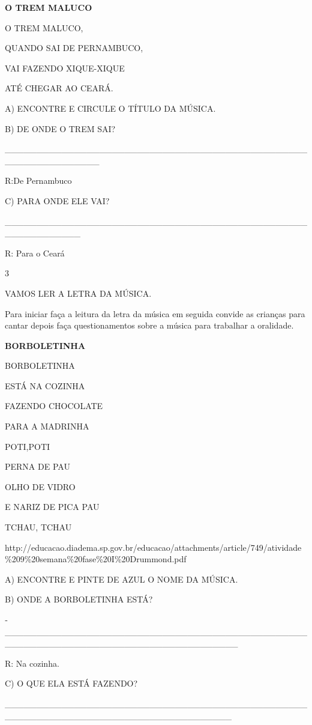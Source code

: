 {{\textbf{O TREM MALUCO}

O TREM MALUCO,

QUANDO SAI DE PERNAMBUCO,

VAI FAZENDO XIQUE-XIQUE

ATÉ CHEGAR AO CEARÁ.

A) ENCONTRE E CIRCULE O TÍTULO DA MÚSICA.

B) DE ONDE O TREM SAI?

\_\_\_\_\_\_\_\_\_\_\_\_\_\_\_\_\_\_\_\_\_\_\_\_\_\_\_\_\_\_\_\_\_\_\_\_\_\_\_\_\_\_\_\_\_\_\_\_\_\_\_\_\_\_\_\_\_\_\_\_\_\_\_

R:De Pernambuco

C) PARA ONDE ELE VAI?

\_\_\_\_\_\_\_\_\_\_\_\_\_\_\_\_\_\_\_\_\_\_\_\_\_\_\_\_\_\_\_\_\_\_\_\_\_\_\_\_\_\_\_\_\_\_\_\_\_\_\_\_\_\_\_\_\_\_\_\_

R: Para o Ceará

\num{3}

VAMOS LER A LETRA DA MÚSICA.

Para iniciar faça a leitura da letra da música em seguida convide as
crianças para cantar depois faça questionamentos sobre a música para
trabalhar a oralidade.

\textbf{BORBOLETINHA}

BORBOLETINHA

ESTÁ NA COZINHA

FAZENDO CHOCOLATE

PARA A MADRINHA

POTI,POTI

PERNA DE PAU

OLHO DE VIDRO

E NARIZ DE PICA PAU

TCHAU, TCHAU

\protect\hypertarget{_Hlk128661930}{}{}http://educacao.diadema.sp.gov.br/educacao/attachments/article/749/atividade\%209\%20semana\%20fase\%20I\%20Drummond.pdf

A) ENCONTRE E PINTE DE AZUL O NOME DA MÚSICA.

B) ONDE A BORBOLETINHA ESTÁ?

­­­­­­­­­­­­­­­­­­­­­­­­­­­\_\_\_\_\_\_\_\_\_\_\_\_\_\_\_\_\_\_\_\_\_\_\_\_\_\_\_\_\_\_\_\_\_\_\_\_\_\_\_\_\_\_\_\_\_\_\_\_\_\_\_\_\_\_\_\_\_\_\_\_\_\_\_\_\_\_\_\_\_\_\_\_\_\_\_\_\_\_\_\_\_\_\_\_\_

R: Na cozinha.

C) O QUE ELA ESTÁ FAZENDO?

\_\_\_\_\_\_\_\_\_\_\_\_\_\_\_\_\_\_\_\_\_\_\_\_\_\_\_\_\_\_\_\_\_\_\_\_\_\_\_\_\_\_\_\_\_\_\_\_\_\_\_\_\_\_\_\_\_\_\_\_\_\_\_\_\_\_\_\_\_\_\_\_\_\_\_\_\_\_\_\_\_\_\_\_

}}
